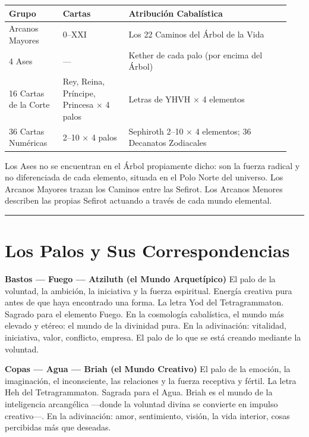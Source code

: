 \begin{longtable}[]{@{}>{\RaggedRight\small}p{0.18\linewidth}>{\RaggedRight\small}p{0.22\linewidth}>{\RaggedRight\small}p{0.54\linewidth}@{}}
\toprule\noalign{}
Grupo & Cartas & Atribución Cabalística \\
\midrule\noalign{}
\endhead
\bottomrule\noalign{}
\endlastfoot
22 Arcanos Mayores & 0--XXI & Los 22 Caminos del Árbol de la Vida \\
4 Ases & --- & Kether de cada palo (por encima del Árbol) \\
16 Cartas de la Corte & Rey, Reina, Príncipe, Princesa × 4 palos & Letras de YHVH × 4 elementos \\
36 Cartas Numéricas & 2--10 × 4 palos & Sephiroth 2--10 × 4 elementos; 36 Decanatos Zodiacales \\
\end{longtable}

Los Ases no se encuentran en el Árbol propiamente dicho: son la fuerza radical y no diferenciada de cada elemento, situada en el Polo Norte del universo. Los Arcanos Mayores trazan los Caminos entre las Sefirot. Los Arcanos Menores describen las propias Sefirot actuando a través de cada mundo elemental.

\begin{center}\rule{0.5\linewidth}{0.5pt}\end{center}

\section{Los Palos y Sus Correspondencias}\label{the-suits-and-their-correspondences}

\textbf{Bastos --- Fuego --- Atziluth (el Mundo Arquetípico)} El palo de la voluntad, la ambición, la iniciativa y la fuerza espiritual. Energía creativa pura antes de que haya encontrado una forma. La letra Yod del Tetragrammaton. Sagrado para el elemento Fuego. En la cosmología cabalística, el mundo más elevado y etéreo: el mundo de la divinidad pura. En la adivinación: vitalidad, iniciativa, valor, conflicto, empresa. El palo de lo que se está creando mediante la voluntad.

\textbf{Copas --- Agua --- Briah (el Mundo Creativo)} El palo de la emoción, la imaginación, el inconsciente, las relaciones y la fuerza receptiva y fértil. La letra Heh del Tetragrammaton. Sagrada para el Agua. Briah es el mundo de la inteligencia arcangélica ---donde la voluntad divina se convierte en impulso creativo---. En la adivinación: amor, sentimiento, visión, la vida interior, cosas percibidas más que deseadas.

